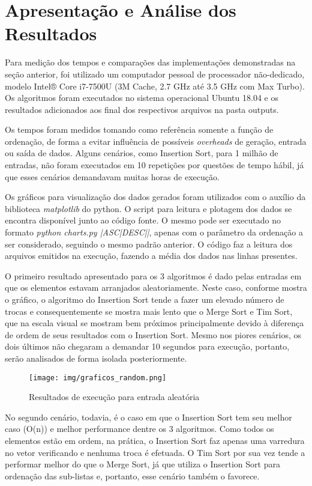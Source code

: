\chapter{Apresentação e Análise dos Resultados}

Para medição dos tempos e comparações das implementações demonstradas na seção anterior, foi utilizado um computador pessoal de processador não-dedicado, modelo Intel® Core i7-7500U (3M Cache, 2.7 GHz até 3.5 GHz com Max Turbo). Os algoritmos foram executados no sistema operacional Ubuntu 18.04 e os resultados adicionados aos final dos respectivos arquivos na pasta outputs. 

Os tempos foram medidos tomando como referência somente a função de ordenação, de forma a evitar influência de possíveis \textit{overheads} de geração, entrada ou saída de dados. Alguns cenários, como Insertion Sort, para 1 milhão de entradas, não foram executados em 10 repetições por questões de tempo hábil, já que esses cenários demandavam muitas horas de execução.

Os gráficos para visualização dos dados gerados foram utilizados com o auxílio da biblioteca \textit{matplotlib} do python. O script para leitura e plotagem dos dados se encontra disponível junto ao código fonte. O mesmo pode ser executado no formato \textit{python charts.py |ASC|DESC||}, apenas com o parâmetro da ordenação a ser considerado, seguindo o mesmo padrão anterior. O código faz a leitura dos arquivos emitidos na execução, fazendo a média dos dados nas linhas presentes.

O primeiro resultado apresentado para os 3 algoritmos é dado pelas entradas em que os elementos estavam arranjados aleatoriamente. Neste caso, conforme mostra o gráfico, o algoritmo do Insertion Sort tende a fazer um elevado número de trocas e consequentemente se mostra mais lento que o Merge Sort e Tim Sort, que na escala visual se mostram bem próximos principalmente devido à diferença de ordem de seus resultados com o Insertion Sort. Mesmo nos piores cenários, os dois últimos não chegaram a demandar 10 segundos para execução, portanto, serão analisados de forma isolada posteriormente.


\begin{figure}[!htb]
\centering
\texttt{[image: img/graficos\_random.png]}
\caption{Resultados de execução para entrada aleatória}
\label{fig:grafico_random}
\end{figure}

No segundo cenário, todavia, é o caso em que o Insertion Sort tem seu melhor caso (O(n)) e melhor performance dentre os 3 algoritmos. Como todos os elementos estão em ordem, na prática, o Insertion Sort faz apenas uma varredura no vetor verificando e nenhuma troca é efetuada. O Tim Sort por sua vez tende a performar melhor do que o Merge Sort, já que utiliza o Insertion Sort para ordenação das sub-listas e, portanto, esse cenário também o favorece.

